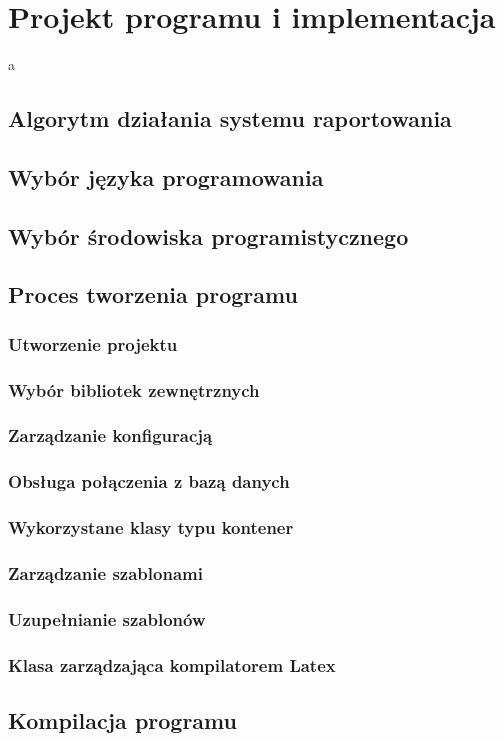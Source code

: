\chapter{Projekt programu i implementacja}
a
\section{Algorytm działania systemu raportowania}
\section{Wybór języka programowania}
\section{Wybór środowiska programistycznego}
\section{Proces tworzenia programu}
\subsection{Utworzenie projektu}
\subsection{Wybór bibliotek zewnętrznych}
\subsection{Zarządzanie konfiguracją}
\subsection{Obsługa połączenia z bazą danych}
\subsection{Wykorzystane klasy typu kontener}
\subsection{Zarządzanie szablonami}
\subsection{Uzupełnianie szablonów}
\subsection{Klasa zarządzająca kompilatorem Latex}
\section{ Kompilacja programu}